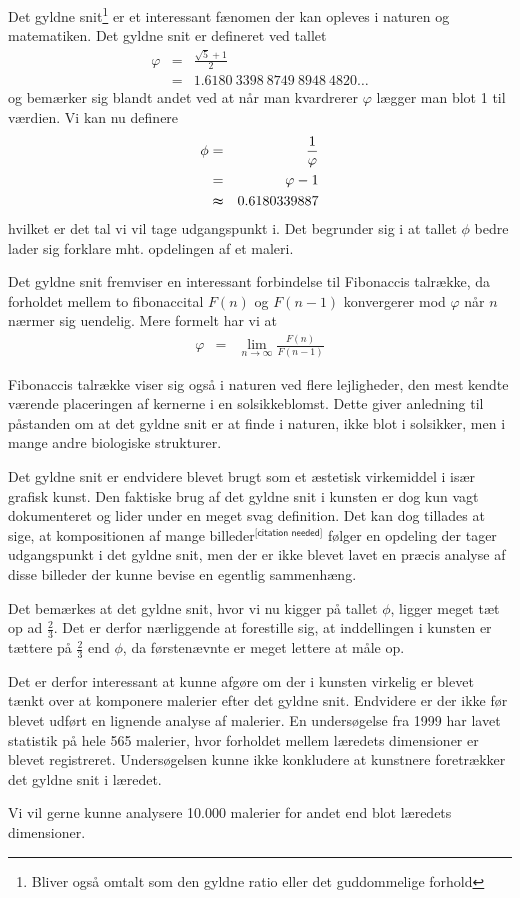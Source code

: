 Det gyldne snit\footnote{Bliver også omtalt som den gyldne ratio eller det
guddommelige forhold} er et interessant fænomen der kan opleves i naturen og
matematiken. Det gyldne snit er defineret ved tallet
\begin{eqnarray*}
	\varphi	& =	& \frac{\sqrt{5} + 1}{2}\\
		& = 	& 1.6180\ 3398\ 8749\ 8948\ 4820 \dots
\end{eqnarray*}
og bemærker sig blandt andet ved at når man kvardrerer $\varphi$ lægger man
blot 1 til værdien\cite{Bib:MWGold}\cite{Bib:Knott}. Vi kan nu definere
\begin{eqnarray*}
	\phi	& = 		& \frac{1}{\varphi}\\
		& = 		& \varphi - 1\\
		& \thickapprox	& 0.6180339887
\end{eqnarray*}
hvilket er det tal vi vil tage udgangspunkt i. Det begrunder sig i at tallet
$\phi$ bedre lader sig forklare mht. opdelingen af et maleri.

Det gyldne snit fremviser en interessant forbindelse til
Fibonaccis talrække, da forholdet mellem to fibonaccital $F(n)$ og $F(n - 1)$
konvergerer mod $\varphi$ når $n$ nærmer sig uendelig. Mere formelt har vi at
\begin{eqnarray*}
	\varphi	& =	& \lim_{n \rightarrow \infty}{\frac{F(n)}{F(n - 1)}}
\end{eqnarray*}

Fibonaccis talrække viser sig også i naturen ved flere lejligheder, den mest
kendte værende placeringen af kernerne i en
solsikkeblomst\cite{Bib:Dou}. Dette
giver anledning til påstanden om at det gyldne snit er at finde i naturen, ikke
blot i solsikker, men i mange andre biologiske strukturer.

Det gyldne snit er endvidere blevet brugt som et æstetisk virkemiddel i især
grafisk kunst. Den faktiske brug af det gyldne snit i kunsten er dog kun vagt
dokumenteret og lider under en meget svag definition\cite{Bib:Mark}.
Det kan dog tillades at sige, at kompositionen af mange
billeder$^{\textsf{[citation needed]}}$ følger en opdeling der tager
udgangspunkt i det gyldne snit, men der er ikke blevet lavet en præcis analyse
af disse billeder der kunne bevise en egentlig sammenhæng.

Det bemærkes at det gyldne snit, hvor vi nu kigger på tallet $\phi$, ligger
meget tæt op ad $\frac{2}{3}$.  Det er derfor nærliggende at forestille sig, at
inddellingen i kunsten er tættere på $\frac{2}{3}$ end $\phi$, da førstenævnte
er meget lettere at måle op.

Det er derfor interessant at kunne afgøre om der i kunsten virkelig er blevet
tænkt over at komponere malerier efter det gyldne snit. Endvidere er der ikke
før blevet udført en lignende analyse af malerier. En undersøgelse fra 1999 har
lavet statistik på hele 565 malerier, hvor forholdet mellem læredets
dimensioner er blevet registreret\cite{Bib:Painting}. Undersøgelsen kunne ikke
konkludere at kunstnere foretrækker det gyldne snit i læredet.

Vi vil gerne kunne analysere 10.000 malerier for andet end blot læredets
dimensioner.
